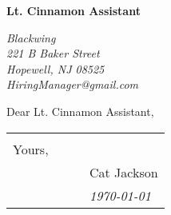 \documentclass[letterpaper,11pt]{article}
\begin{document}



\newcommand{\fooHiringManager}{Lt. Cinnamon Assistant}

\newcommand{\fooCompany}{Blackwing}

\newcommand{\fooAddress}{221 B Baker Street \\ Hopewell, NJ 08525}

\newcommand{\fooEmail}{HiringManager@gmail.com}















%
%
\clearpage


\textbf{\fooHiringManager} 

\emph{\fooCompany \\ \fooAddress \\ \fooEmail}\newline


 Dear \fooHiringManager,




\begin{flushright}
\begin{tabular}{@{}l@{}}
\rule{0pt}{2cm}\hspace*{5cm}\\%
Yours,\\
~~~~~~~~~~~~\Large{Cat Jackson}\\
~~~~~~~~~~~~\emph{\today}
\end{tabular}
\end{flushright}
\end{document}
